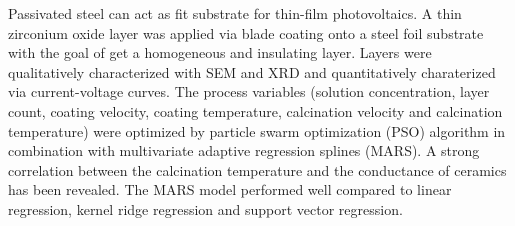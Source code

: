 Passivated steel can act as fit substrate for thin-film photovoltaics.
A thin zirconium oxide layer was applied via blade coating onto a steel foil substrate with the goal of get a homogeneous and insulating layer.
Layers were qualitatively characterized with SEM and XRD and quantitatively charaterized via current-voltage curves.
The process variables (solution concentration, layer count, coating velocity, coating temperature, calcination velocity and calcination temperature) were optimized by particle swarm optimization (PSO) algorithm in combination with multivariate adaptive regression splines (MARS).
A strong correlation between the calcination temperature and the conductance of ceramics has been revealed. 
The MARS model performed well compared to 
linear regression, kernel ridge regression and support vector regression.
